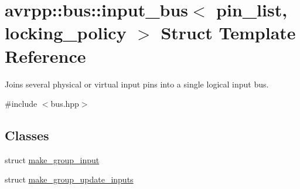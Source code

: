 \hypertarget{structavrpp_1_1bus_1_1input__bus}{
\section{avrpp::bus::input\_\-bus$<$ pin\_\-list, locking\_\-policy $>$ Struct Template Reference}
\label{structavrpp_1_1bus_1_1input__bus}
}


Joins several physical or virtual input pins into a single logical input bus.  




{\ttfamily \#include $<$bus.hpp$>$}

\subsection*{Classes}
\begin{DoxyCompactItemize}
\item 
struct \hyperlink{structavrpp_1_1bus_1_1input__bus_1_1make__group__input}{make\_\-group\_\-input}
\item 
struct \hyperlink{structavrpp_1_1bus_1_1input__bus_1_1make__group__update__inputs}{make\_\-group\_\-update\_\-inputs}
\end{DoxyCompactItemize}
